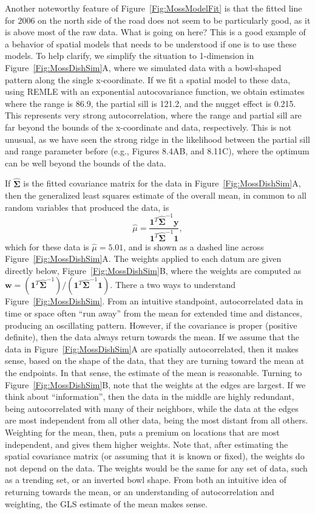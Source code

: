 \documentclass[12pt, titlepage]{article}
\begin{document}
Another noteworthy feature of Figure~\ref{Fig:MossModelFit} is that the fitted line for 2006 on the north side of the road does not seem to be particularly good, as it is above most of the raw data.  What is going on here?  This is a good example of a behavior of spatial models that needs to be understood if one is to use these models.  To help clarify, we simplify the situation to 1-dimension in Figure~\ref{Fig:MossDishSim}A, where we simulated data with a bowl-shaped pattern along the single x-coordinate.  If we fit a spatial model to these data, using REMLE with an exponential autocovariance function, we obtain estimates where the range is 86.9, the partial sill is 121.2, and the nugget effect is 0.215.  This represents very strong autocorrelation, where the range and partial sill are far beyond the bounds of the x-coordinate and data, respectively.  This is not unusual, as we have seen the strong ridge in the likelihood between the partial sill and range parameter before (e.g., Figures 8.4AB, and 8.11C), where the optimum can be well beyond the bounds of the data.

If $\hat{\boldsymbol{\Sigma}}$ is the fitted covariance matrix for the data in Figure~\ref{Fig:MossDishSim}A, then the generalized least squares estimate of the overall mean, in common to all random variables that produced the data, is
$$
\hat{\mu} = \frac{\mathbf{1}^{T}\hat{\boldsymbol{\Sigma}}^{-1}\mathbf{y}}{\mathbf{1}^{T}\hat{\boldsymbol{\Sigma}}^{-1}\mathbf{1}},
$$
which for these data is $\hat{\mu} = 5.01$, and is shown as a dashed line across Figure~\ref{Fig:MossDishSim}A.  The weights applied to each datum are given directly below, Figure~\ref{Fig:MossDishSim}B, where the weights are computed as $
\mathbf{w} = (\mathbf{1}^{T}\hat{\boldsymbol{\Sigma}}^{-1})/(\mathbf{1}^{T}\hat{\boldsymbol{\Sigma}}^{-1}\mathbf{1})$.  There a two ways to understand Figure~\ref{Fig:MossDishSim}.  From an intuitive standpoint, autocorrelated data in time or space often ``run away'' from the mean for extended time and distances, producing an oscillating pattern.  However, if the covariance is proper (positive definite), then the data always return towards the mean.  If we assume that the data in Figure~\ref{Fig:MossDishSim}A are spatially autocorrelated, then it makes sense, based on the shape of the data, that they are turning toward the mean at the endpoints.  In that sense, the estimate of the mean is reasonable.  Turning to Figure~\ref{Fig:MossDishSim}B, note that the weights at the edges are largest.  If we think about ``information'', then the data in the middle are highly redundant, being autocorrelated with many of their neighbors, while the data at the edges are most independent from all other data, being the most distant from all others.  Weighting for the mean, then, puts a premium on locations that are most independent, and gives them higher weights. Note that, after estimating the spatial covariance matrix (or assuming that it is known or fixed), the weights do not depend on the data.  The weights would be the same for any set of data, such as a trending set, or an inverted bowl shape. From both an intuitive idea of returning towards the mean, or an understanding of autocorrelation and weighting, the GLS estimate of the mean makes sense.  
\end{document}
